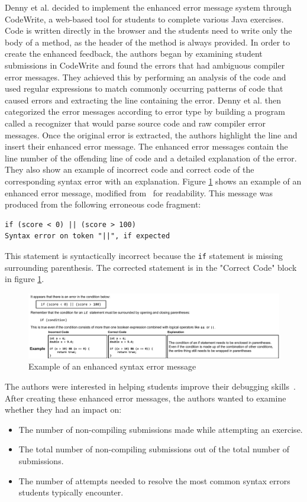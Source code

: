 \documentclass{sig-alternate}
\begin{document}
Denny et al. decided to implement the enhanced error message system through CodeWrite, a web-based tool for students to complete various Java exercises.
Code is written directly in the browser and the students need to write only the body of a method, as the header of the method is always provided.
In order to create the enhanced feedback, the authors began by examining student submissions in CodeWrite and found the errors that had ambiguous compiler error messages. 
They achieved this by performing an analysis of the code and used regular expressions to match commonly occurring patterns of code that caused errors and extracting the line containing the error.
Denny et al. then categorized the error messages according to error type by building a program called a recognizer that would parse source code and raw compiler error messages.
Once the original error is extracted, the authors highlight the line and insert their enhanced error message.
The enhanced error messages contain the line number of the offending line of code and a detailed explanation of the error.
They also show an example of incorrect code and correct code of the corresponding syntax error with an explanation.
Figure \ref{fig:ese} shows an example of an enhanced error message, modified from~\cite{Denny:2014:ESE:2591708.2591748} for readability.
This message was produced from the following erroneous code fragment:

\begin{verbatim}
if (score < 0) || (score > 100)
Syntax error on token "||", if expected
\end{verbatim}

This statement is syntactically incorrect because the \texttt{if} statement is missing surrounding parenthesis. The corrected statement is in the "Correct Code" block in figure \ref{fig:ese}.

\begin{figure}
  \centering
  \includegraphics[keepaspectratio, width=\textwidth]{EnhancedSyntaxError.pdf}
  \caption{Example of an enhanced syntax error message}
  \label{fig:ese}
\end{figure}

The authors were interested in helping students improve their debugging skills~\cite{Denny:2014:ESE:2591708.2591748}.
After creating these enhanced error messages, the authors wanted to examine whether they had an impact on:
\begin{itemize}
	\item The number of non-compiling submissions made while attempting an exercise.
	\item The total number of non-compiling submissions out of the total number of submissions.
	\item The number of attempts needed to resolve the most common syntax errors students typically encounter.
\end{itemize}
\end{document}
